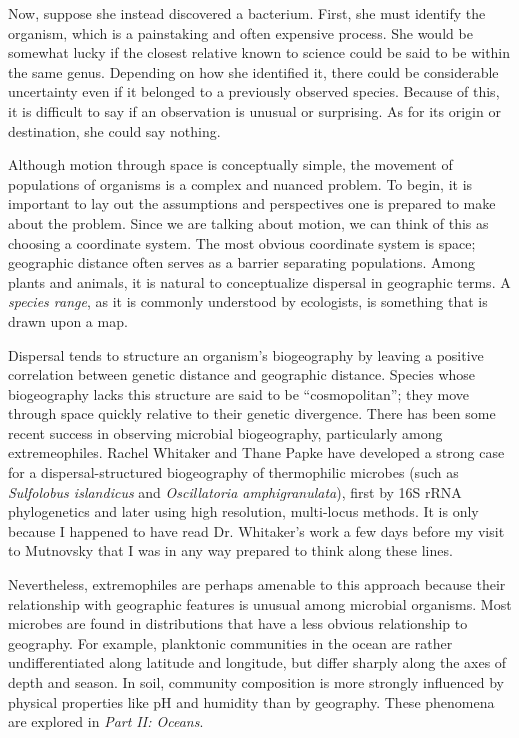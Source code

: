 Now, suppose she instead discovered a bacterium. First, she must identify the organism, which is a painstaking and often expensive process. She would be somewhat lucky if the closest relative known to science could be said to be within the same genus. Depending on how she identified it, there could be considerable uncertainty even if it belonged to a previously observed species. Because of this, it is difficult to say if an observation is unusual or surprising. As for its origin or destination, she could say nothing.

Although motion through space is conceptually simple, the movement of populations of organisms is a complex and nuanced problem. To begin, it is important to lay out the assumptions and perspectives one is prepared to make about the problem. Since we are talking about motion, we can think of this as choosing a coordinate system. The most obvious coordinate system is space; geographic distance often serves as a barrier separating populations. Among plants and animals, it is natural to conceptualize dispersal in geographic terms. A {\em species range}, as it is commonly understood by ecologists, is something that is drawn upon a map. 

Dispersal tends to structure an organism's biogeography by leaving a positive correlation between genetic distance and geographic distance. Species whose biogeography lacks this structure are said to be ``cosmopolitan''; they move through space quickly relative to their genetic divergence. There has been some recent success in observing microbial biogeography, particularly among extremeophiles. Rachel Whitaker and Thane Papke have developed a strong case for a dispersal-structured biogeography of thermophilic microbes (such as {\em Sulfolobus islandicus} and {\em Oscillatoria amphigranulata}), first by 16S rRNA phylogenetics and later using high resolution, multi-locus methods. \cite{whitaker2003geographic, whitaker2006population, bahl2011ancient, papke2003geographical, papke2015horizontal} It is only because I happened to have read Dr. Whitaker's work a few days before my visit to Mutnovsky that I was in any way prepared to think along these lines.

Nevertheless, extremophiles are perhaps amenable to this approach because their relationship with geographic features is unusual among microbial organisms. Most microbes are found in distributions that have a less obvious relationship to geography. For example, planktonic communities in the ocean are rather undifferentiated along latitude and longitude, but differ sharply along the axes of depth and season. In soil, community composition is more strongly influenced by physical properties like pH and humidity than by geography. These phenomena are explored in {\em Part II: Oceans}.

